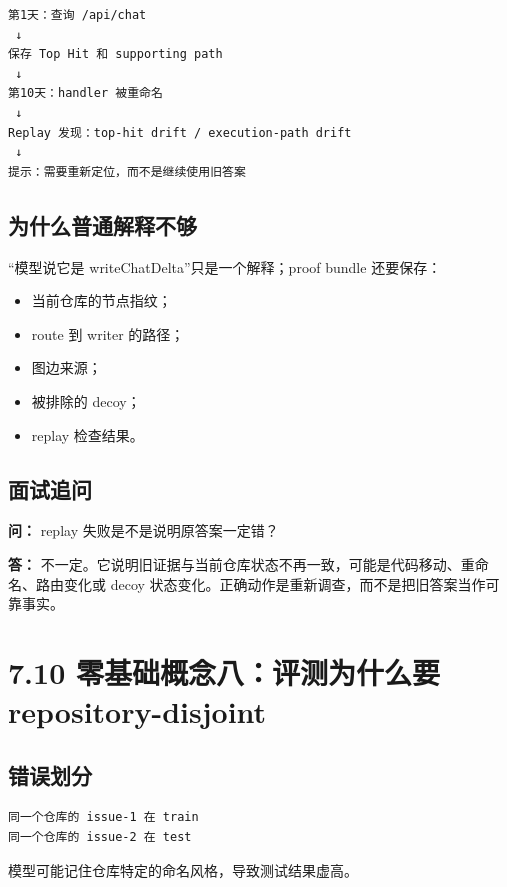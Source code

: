\documentclass[UTF8,12pt,openany]{ctexbook}
\begin{document}
\begin{lstlisting}
第1天：查询 /api/chat
 ↓
保存 Top Hit 和 supporting path
 ↓
第10天：handler 被重命名
 ↓
Replay 发现：top-hit drift / execution-path drift
 ↓
提示：需要重新定位，而不是继续使用旧答案
\end{lstlisting}

\subsection{为什么普通解释不够}

“模型说它是 writeChatDelta”只是一个解释；proof bundle 还要保存：\par

\begin{itemize}
\item 当前仓库的节点指纹；
\item route 到 writer 的路径；
\item 图边来源；
\item 被排除的 decoy；
\item replay 检查结果。
\end{itemize}

\subsection{面试追问}

\textbf{问：} replay 失败是不是说明原答案一定错？\par

\textbf{答：} 不一定。它说明旧证据与当前仓库状态不再一致，可能是代码移动、重命名、路由变化或 decoy 状态变化。正确动作是重新调查，而不是把旧答案当作可靠事实。\par

\section{7.10 零基础概念八：评测为什么要 repository-disjoint}

\subsection{错误划分}

\begin{lstlisting}
同一个仓库的 issue-1 在 train
同一个仓库的 issue-2 在 test
\end{lstlisting}

模型可能记住仓库特定的命名风格，导致测试结果虚高。\par
\end{document}
